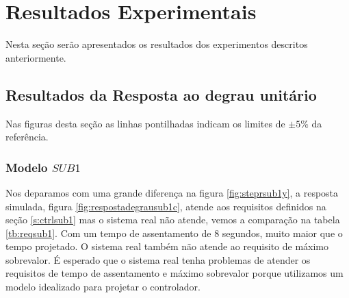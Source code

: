 \section{Resultados Experimentais}
Nesta seção serão apresentados os resultados dos experimentos descritos anteriormente.
\subsection{Resultados da Resposta ao degrau unitário}\label{rstep}

Nas figuras desta seção as linhas pontilhadas indicam os limites de $\pm 5\%$ da referência.

\subsubsection{Modelo $SUB1$}
Nos deparamos com uma grande diferença na figura \ref{fig:steprsub1y}, a resposta simulada, figura \ref{fig:respostadegrausub1c}, atende aos requisitos definidos na seção \ref{s:ctrlsub1} mas o sistema real não atende, vemos a comparação na tabela \ref{tb:reqsub1}. Com um tempo de assentamento de 8 segundos, muito maior que o tempo projetado. O sistema real também não atende ao requisito de máximo sobrevalor. É esperado que o sistema real tenha problemas de atender os requisitos de tempo de assentamento e máximo sobrevalor porque utilizamos um modelo idealizado para projetar o controlador.

